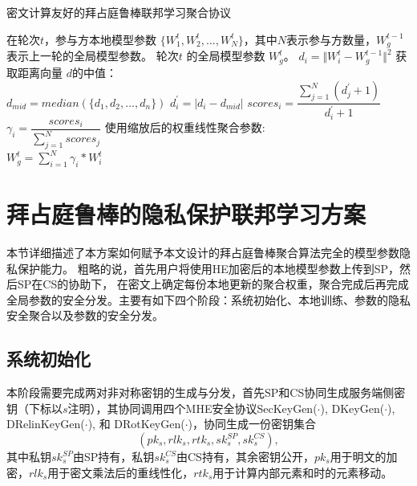 \begin{algorithm}[htbp]
	\caption{密文计算友好的拜占庭鲁棒联邦学习聚合协议}
	\label{a0}
	\begin{algorithmic}[1]
		\REQUIRE 在轮次$t$，参与方本地模型参数 $\{W_1^t, W_2^t, ..., W_N^t\}$，其中$N$表示参与方数量，$W_g^{t-1}$ 表示上一轮的全局模型参数。
		\ENSURE 轮次$t$ 的全局模型参数 $W_g^t$。 
		\STATE ${d}_i = \Vert W_i^t - W_g^{t-1} \Vert ^2$
		\ENDFOR
		\STATE 获取距离向量 ${d}$的中值：\\${d}_{mid} = median(\{{d}_{1}, {d}_{2},..., {d}_{n}\})$
		\STATE $d^{\prime}_{i}=\left|d_i-d_{mid}\right|$
		\ENDFOR
	\STATE $scores_i=\dfrac{\sum_{j=1}^{N} (d^{\prime}_{j} + 1)}{d^{\prime}_i + 1}$ 
	\ENDFOR
	\STATE $\gamma_i=\dfrac{scores_i}{\sum_{j=1}^{N} scores_j}$
	\ENDFOR
	\STATE 使用缩放后的权重线性聚合参数:\\
	$W_g^{t} =\sum_{i=1}^{N}\gamma_i * W_i^{t}$
\end{algorithmic}
\end{algorithm}

\section{拜占庭鲁棒的隐私保护联邦学习方案}\label{PBFL}
本节详细描述了本方案如何赋予本文设计的拜占庭鲁棒聚合算法完全的模型参数隐私保护能力。
粗略的说，首先用户将使用HE加密后的本地模型参数上传到SP，然后SP在CS的协助下，
在密文上确定每份本地更新的聚合权重，聚合完成后再完成全局参数的安全分发。主要有如下四个阶段：系统初始化、本地训练、参数的隐私安全聚合以及参数的安全分发。

\subsection{系统初始化}
本阶段需要完成两对非对称密钥的生成与分发，首先SP和CS协同生成服务端侧密钥（下标以$ s $注明），其协同调用四个MHE安全协议SecKeyGen($\cdot$), DKeyGen($\cdot$), DRelinKeyGen($\cdot$), 和 DRotKeyGen($\cdot$)，协同生成一份密钥集合$$ (pk_s, rlk_s, rtk_s, sk_{s}^{SP}, sk_{s}^{CS}),$$其中私钥$ sk_{s}^{SP} $由SP持有，私钥$ sk_{s}^{CS} $由CS持有，其余密钥公开，$ pk_s $用于明文的加密，$ rlk_s $用于密文乘法后的重线性化，$ rtk_s $用于计算内部元素和时的元素移动。

